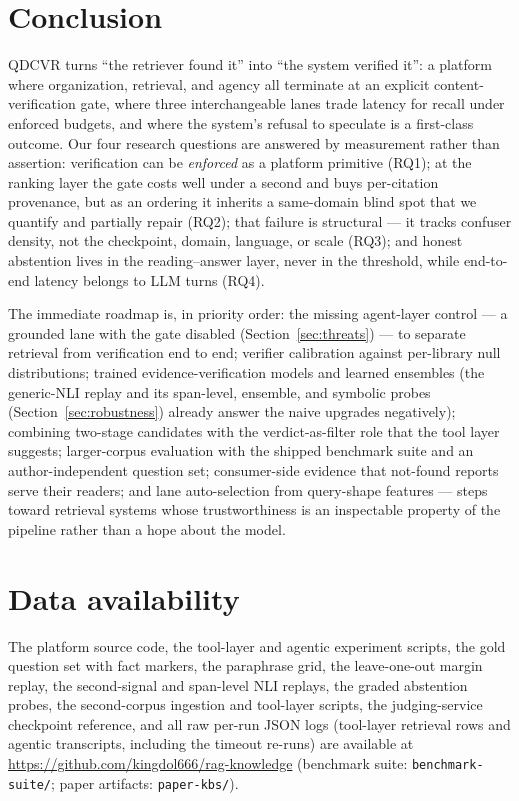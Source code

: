 \documentclass[preprint,12pt]{elsarticle}
\begin{document}
\section{Conclusion}
\label{sec:conclusion}

QDCVR turns ``the retriever found it'' into ``the system verified it'':
a platform where organization, retrieval, and agency all terminate at an
explicit content-verification gate, where three interchangeable lanes trade
latency for recall under enforced budgets, and where the system's refusal
to speculate is a first-class outcome. Our four research questions are
answered by measurement rather than assertion: verification can be
\emph{enforced} as a platform primitive (RQ1); at the ranking layer the gate
costs well under a second and buys per-citation provenance, but as an ordering
it inherits a same-domain blind spot that we quantify and partially repair
(RQ2); that failure is structural --- it tracks confuser density, not the
checkpoint, domain, language, or scale (RQ3); and honest abstention lives in
the reading--answer layer, never in the threshold, while end-to-end latency
belongs to LLM turns (RQ4).

The immediate roadmap is, in priority order: the missing agent-layer control
--- a grounded lane with the gate disabled (Section~\ref{sec:threats}) --- to
separate retrieval from verification end to end; verifier calibration against
per-library null distributions; trained
evidence-verification models and learned ensembles (the generic-NLI
replay and its span-level, ensemble, and symbolic probes
(Section~\ref{sec:robustness}) already answer the naive upgrades
negatively); combining two-stage
candidates with the verdict-as-filter role that the tool layer suggests;
larger-corpus evaluation with the shipped benchmark suite and an
author-independent question set; consumer-side evidence that
not-found reports serve their readers; and lane auto-selection from
query-shape features --- steps toward retrieval systems whose trustworthiness
is an inspectable property of the pipeline rather than a hope about the
model.

\section*{Data availability}
The platform source code, the tool-layer and agentic experiment scripts,
the gold question set with fact markers, the paraphrase grid, the
leave-one-out margin replay, the second-signal and span-level NLI
replays, the graded abstention probes, the second-corpus ingestion and
tool-layer scripts, the judging-service checkpoint
reference, and all raw per-run JSON logs (tool-layer retrieval rows and
agentic transcripts, including the timeout re-runs) are available at
\url{https://github.com/kingdol666/rag-knowledge} (benchmark suite:
\texttt{benchmark-suite/}; paper artifacts: \texttt{paper-kbs/}).
\end{document}
